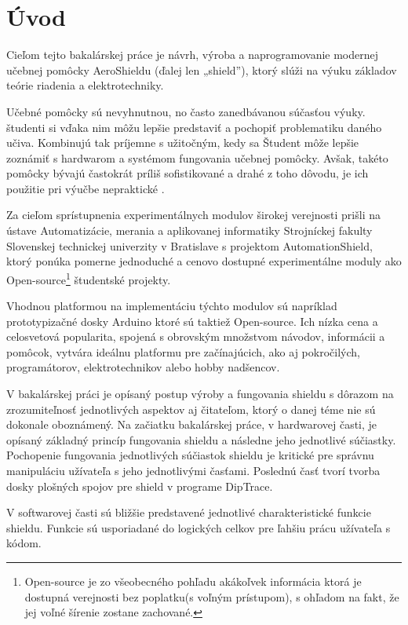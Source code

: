 \chapter*{Úvod}
\label{UVOD}


Cieľom tejto bakalárskej práce je návrh, výroba a naprogramovanie modernej učebnej pomôcky AeroShieldu (ďalej len „shield”), ktorý slúži na výuku základov teórie riadenia a elektrotechniky.

Učebné pomôcky sú nevyhnutnou, no často zanedbávanou súčasťou výuky. študenti si vďaka nim môžu lepšie predstaviť a pochopiť problematiku daného učiva. Kombinujú tak príjemne s užitočným, kedy sa Študent môže lepšie zoznámiť s hardwarom a systémom fungovania učebnej pomôcky.
Avšak, takéto pomôcky bývajú častokrát príliš sofistikované a drahé \cite{Hor} z toho dôvodu, je ich použitie pri výučbe nepraktické .

Za cieľom sprístupnenia experimentálnych modulov širokej verejnosti prišli na ústave Automatizácie, merania a aplikovanej informatiky
Strojníckej fakulty Slovenskej technickej univerzity v Bratislave s projektom AutomationShield, ktorý ponúka pomerne jednoduché a cenovo dostupné experimentálne moduly ako Open-source\footnote[1]{Open-source je zo všeobecného pohľadu akákoľvek informácia ktorá je dostupná verejnosti bez poplatku(s voľným prístupom), s ohľadom na fakt, že jej voľné šírenie zostane zachované.} študentské projekty.

Vhodnou platformou na implementáciu týchto modulov sú napríklad prototypizačné dosky Arduino ktoré sú taktiež Open-source. Ich nízka cena a celosvetová popularita, spojená s obrovským množstvom návodov, informácii a pomôcok, vytvára ideálnu platformu pre začínajúcich, ako aj pokročilých, programátorov, elektrotechnikov alebo hobby nadšencov.

V bakalárskej práci je opísaný postup výroby a fungovania shieldu s dôrazom na zrozumiteľnosť jednotlivých aspektov aj čitateľom, ktorý o danej téme nie sú dokonale oboznámený. Na začiatku bakalárskej práce, v hardwarovej časti, je opísaný základný princíp fungovania shieldu a následne jeho jednotlivé súčiastky. Pochopenie fungovania jednotlivých súčiastok shieldu je kritické pre správnu manipuláciu užívateľa s jeho jednotlivými časťami. Poslednú časť tvorí tvorba dosky plošných spojov pre shield v programe DipTrace.

V softwarovej časti sú bližšie predstavené jednotlivé charakteristické funkcie shieldu. Funkcie sú usporiadané do logických celkov pre ľahšiu prácu užívateľa s kódom.


